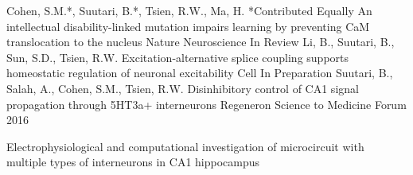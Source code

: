 


\begin{cventries}


\cventry
{Cohen, S.M.*, Suutari, B.*, Tsien, R.W., Ma, H. \newline \mbox{*}Contributed Equally} %
{An intellectual disability-linked mutation impairs learning by preventing CaM translocation to the nucleus} %
{Nature Neuroscience} %
{In Review} %
{ %
}
\cventry
{Li, B., Suutari, B., Sun, S.D., Tsien, R.W.} %
{Excitation-alternative splice coupling supports 
homeostatic regulation of neuronal excitability} %
{Cell} %
{In Preparation} %
{ %
}
\cventry
{Suutari, B., Salah, A., Cohen, S.M., Tsien, R.W.} %
{Disinhibitory control of CA1 signal propagation through 5HT3a+ interneurons} %
{Regeneron Science to Medicine Forum} %
{2016} %
{ %
\begin{cvitems}
\item {Electrophysiological and computational investigation of microcircuit with multiple types of interneurons in CA1 hippocampus}
\end{cvitems}
}


\end{cventries}

